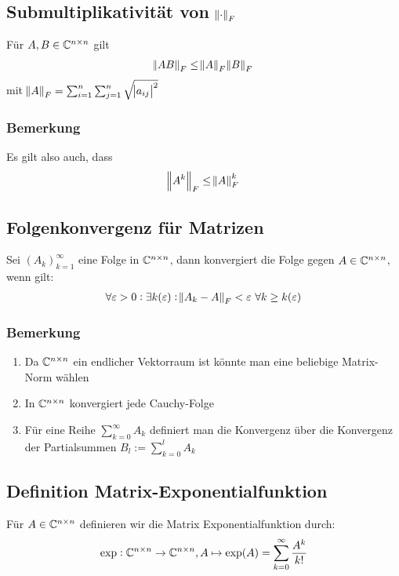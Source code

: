 \subsection{Submultiplikativität von $\norm{\cdot}_F$}
Für $A,B \in \mathbb{C}^{n \times n}$ gilt
\begin{eqnarray*}
	\norm{A B}_F \leq \norm{A}_F \norm{B}_F
\end{eqnarray*}
mit $\norm{A}_F = \sum_{i=1}^n \sum_{j=1}^n \sqrt{ \abs{a_{ij}}^2}$

\subsubsection{Bemerkung}
Es gilt also auch, dass
\begin{eqnarray*}
 	\norm{A^k}_F \leq \norm{A}_F^k
\end{eqnarray*}

\subsection{Folgenkonvergenz für Matrizen}
Sei ${(A_k)}_{k=1}^\infty$ eine Folge in $\mathbb{C}^{n \times n}$, dann konvergiert die Folge gegen $A \in \mathbb{C}^{n \times n}$,
wenn gilt:
\begin{eqnarray*}
	\forall \varepsilon > 0: \exists k(\varepsilon): \norm{A_k - A}_F < \varepsilon\ \forall k \geq k(\varepsilon)
\end{eqnarray*}

\subsubsection{Bemerkung}
\begin{enumerate}[label= (\alph*)]
	\item Da $\mathbb{C}^{n \times n}$ ein endlicher Vektorraum ist könnte man eine beliebige Matrix-Norm wählen
	\item In $\mathbb{C}^{n \times n}$ konvergiert jede Cauchy-Folge
	\item Für eine Reihe $\sum_{k=0}^\infty A_k$ definiert man die Konvergenz über die Konvergenz der Partialsummen
		$B_l := \sum_{k=0}^l A_k$
\end{enumerate}

\subsection{Definition Matrix-Exponentialfunktion}
Für $A \in \mathbb{C}^{n \times n}$ definieren wir die Matrix Exponentialfunktion durch:
\begin{eqnarray*}
	\exp: \mathbb{C}^{n \times n} \to \mathbb{C}^{n \times n}, A \mapsto \exp(A) = \sum_{k=0}^\infty \frac{A^k}{k!}
\end{eqnarray*}


